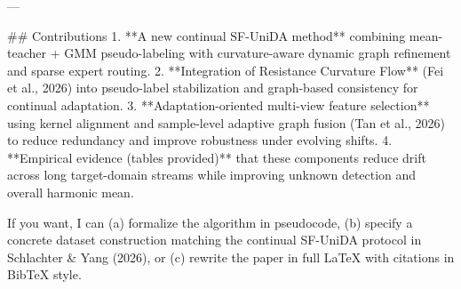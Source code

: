 ---

## Contributions  
1. **A new continual SF-UniDA method** combining mean-teacher + GMM pseudo-labeling with curvature-aware dynamic graph refinement and sparse expert routing.  
2. **Integration of Resistance Curvature Flow** (Fei et al., 2026) into pseudo-label stabilization and graph-based consistency for continual adaptation.  
3. **Adaptation-oriented multi-view feature selection** using kernel alignment and sample-level adaptive graph fusion (Tan et al., 2026) to reduce redundancy and improve robustness under evolving shifts.  
4. **Empirical evidence (tables provided)** that these components reduce drift across long target-domain streams while improving unknown detection and overall harmonic mean.

If you want, I can (a) formalize the algorithm in pseudocode, (b) specify a concrete dataset construction matching the continual SF-UniDA protocol in Schlachter & Yang (2026), or (c) rewrite the paper in full LaTeX with citations in BibTeX style.